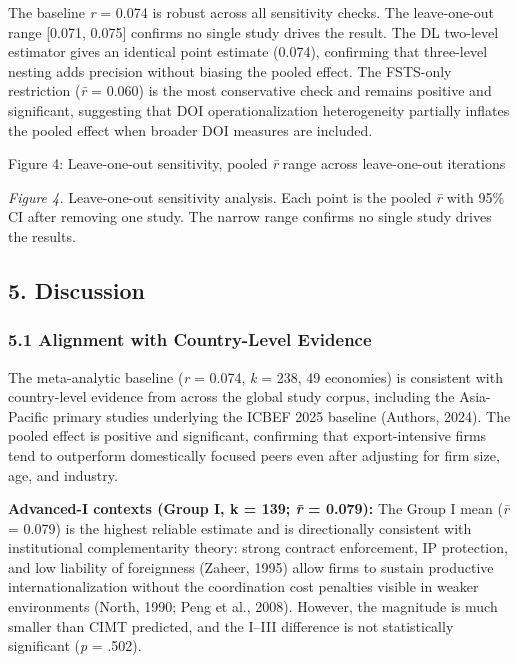\documentclass[
  12pt,a4paper]{article}
\begin{document}
The baseline \emph{r} = 0.074 is robust across all sensitivity checks.
The leave-one-out range {[}0.071, 0.075{]} confirms no single study
drives the result. The DL two-level estimator gives an identical point
estimate (0.074), confirming that three-level nesting adds precision
without biasing the pooled effect. The FSTS-only restriction (\emph{r̄} =
0.060) is the most conservative check and remains positive and
significant, suggesting that DOI operationalization heterogeneity
partially inflates the pooled effect when broader DOI measures are
included.

Figure 4: Leave-one-out sensitivity, pooled \emph{r̄} range across
leave-one-out iterations

\emph{Figure 4.} Leave-one-out sensitivity analysis. Each point is the
pooled \emph{r̄} with 95\% CI after removing one study. The narrow range
confirms no single study drives the results.

\hypertarget{discussion}{%
\subsection{5. Discussion}\label{discussion}}

\hypertarget{alignment-with-country-level-evidence}{%
\subsubsection{5.1 Alignment with Country-Level
Evidence}\label{alignment-with-country-level-evidence}}

The meta-analytic baseline (\emph{r} = 0.074, \emph{k} = 238, 49
economies) is consistent with country-level evidence from across the
global study corpus, including the Asia-Pacific primary studies
underlying the ICBEF 2025 baseline (Authors, 2024). The pooled effect is
positive and significant, confirming that export-intensive firms tend to
outperform domestically focused peers even after adjusting for firm
size, age, and industry.

\textbf{Advanced-I contexts (Group I, k = 139; \emph{r̄} = 0.079):} The
Group I mean (\emph{r̄} = 0.079) is the highest reliable estimate and is
directionally consistent with institutional complementarity theory:
strong contract enforcement, IP protection, and low liability of
foreignness (Zaheer, 1995) allow firms to sustain productive
internationalization without the coordination cost penalties visible in
weaker environments (North, 1990; Peng et al., 2008). However, the
magnitude is much smaller than CIMT predicted, and the I--III difference
is not statistically significant (\emph{p} = .502).
\end{document}
